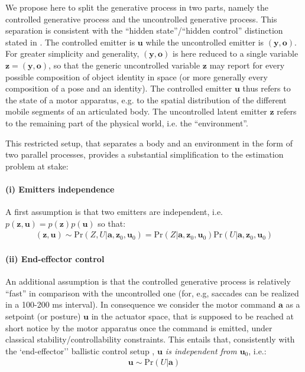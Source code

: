 \documentclass[12pt,twoside,openright]{article}
\begin{document}
We propose here to split the generative process in two parts, namely the controlled generative process and the uncontrolled generative process. 
This separation 
is consistent with the ``hidden state''/``hidden control'' distinction stated in \cite{friston2012perceptions}.
The controlled emitter is $\boldsymbol{u}$ while the uncontrolled emitter is  $(\boldsymbol{y}, \boldsymbol{o})$. 
For greater simplicity and generality, $(\boldsymbol{y},\boldsymbol{o})$ is here reduced to a single variable $\boldsymbol{z} = (\boldsymbol{y}, \boldsymbol{o})$, 
so that the generic uncontrolled variable $\boldsymbol{z}$ may report for every possible composition of object identity in space (or more generally every composition of a pose and an identity).
The controlled emitter $\boldsymbol{u}$ thus refers to the state of a motor apparatus, e.g. to the spatial distribution of the different mobile segments of an articulated body. The uncontrolled latent emitter $\boldsymbol{z}$  refers to the remaining part of the physical world, i.e. the ``environment''. 

This restricted setup, that separates a body and an environment in the form of two parallel processes,  provides a substantial simplification to the estimation problem at stake: 
\paragraph{(i) Emitters independence}
A first assumption is that two emitters are independent, i.e. $p(\boldsymbol{z}, \boldsymbol{u}) = p(\boldsymbol{z})p(\boldsymbol{u})$ so that:
\begin{align}
(\boldsymbol{z},\boldsymbol{u}) \sim \text{Pr}(Z,U|\boldsymbol{a}, \boldsymbol{z}_0, \boldsymbol{u}_0) = \text{Pr}(Z|\boldsymbol{a}, \boldsymbol{z}_0, \boldsymbol{u}_0) \text{Pr}(U|\boldsymbol{a}, \boldsymbol{z}_0, \boldsymbol{u}_0)\nonumber
\end{align}
	
\paragraph{(ii) End-effector control}
An additional assumption is that the controlled generative process is relatively ``fast'' in comparison with the uncontrolled one
(for, e.g, saccades can be realized in a 100-200 ms interval). 
In consequence we consider the motor command $\boldsymbol{a}$ as a setpoint (or posture) $\boldsymbol{u}$ in the actuator space, that is supposed to be reached 
at short notice by the motor apparatus once the command is emitted, under classical stability/controllability constraints.
This entails that, consistently with the `end-effector'' ballistic control setup \cite{mussa2004neural},  \emph{$\boldsymbol{u}$ is independent from $\boldsymbol{u}_0$},
i.e.:
\begin{align*}
\boldsymbol{u}\sim\text{Pr}(U|\boldsymbol{a})
\end{align*}
\end{document}

